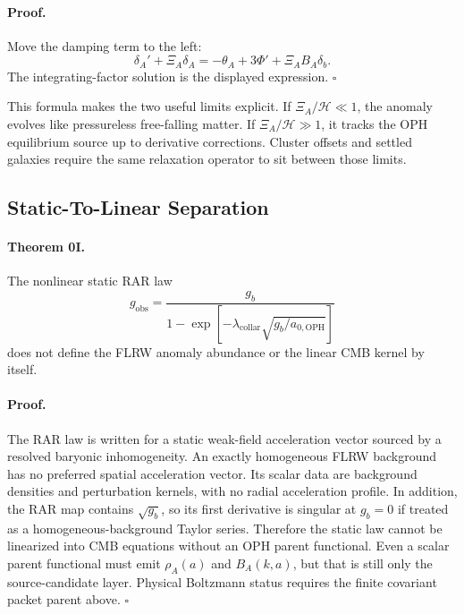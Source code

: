 \documentclass[11pt]{article}
\newcommand{\aoph}{a_{0,\mathrm{OPH}}}
\newcommand{\lambdac}{\lambda_{\mathrm{collar}}}
\begin{document}
\paragraph{Proof.}
Move the damping term to the left:
\begin{equation}
  \delta_A' + \Xi_A\delta_A
  =
  -\theta_A+3\Phi' + \Xi_A B_A\delta_b.
\end{equation}
The integrating-factor solution is the displayed expression. \(\square\)

This formula makes the two useful limits explicit.  If
\(\Xi_A/\mathcal H\ll1\), the anomaly evolves like pressureless free-falling
matter.  If \(\Xi_A/\mathcal H\gg1\), it tracks the OPH equilibrium source up
to derivative corrections.  Cluster offsets and settled galaxies require the
same relaxation operator to sit between those limits.

\subsection{Static-To-Linear Separation}

\paragraph{Theorem 0I.}
The nonlinear static RAR law
\begin{equation}
  g_{\mathrm{obs}}
  =
  \frac{g_b}{1-\exp[-\lambdac\sqrt{g_b/\aoph}]}
\end{equation}
does not define the FLRW anomaly abundance or the linear CMB kernel by itself.

\paragraph{Proof.}
The RAR law is written for a static weak-field acceleration vector sourced by a
resolved baryonic inhomogeneity.  An exactly homogeneous FLRW background has no
preferred spatial acceleration vector.  Its scalar data are background
densities and perturbation kernels, with no radial acceleration profile.  In
addition, the RAR map contains \(\sqrt{g_b}\), so its first derivative is
singular at \(g_b=0\) if treated as a homogeneous-background Taylor series.
Therefore the static law cannot be linearized into CMB equations without an
OPH parent functional.  Even a scalar parent functional must emit
\(\rho_A(a)\) and \(B_A(k,a)\), but that is still only the source-candidate
layer.  Physical Boltzmann status requires the finite covariant packet parent
above. \(\square\)
\end{document}
